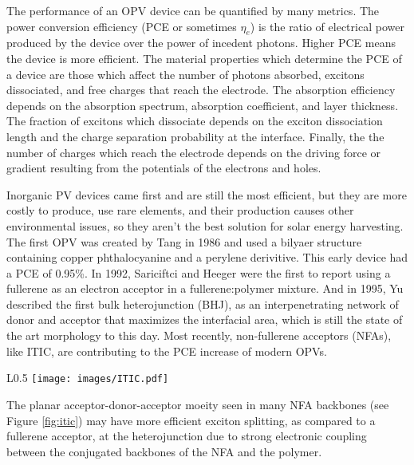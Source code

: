 The performance of an OPV device can be quantified by many metrics.
The power conversion efficiency (PCE or sometimes $\eta_{e}$) is the ratio of electrical power produced by the device over the power of incedent photons.
Higher PCE means the device is more efficient.  
The material properties which determine the PCE of a device are those which affect the number of photons absorbed, excitons dissociated, and free charges that reach the electrode.
The absorption efficiency depends on the absorption spectrum, absorption coefficient, and layer thickness.
The fraction of excitons which dissociate depends on the exciton dissociation length and the charge separation probability at the interface.
Finally, the the number of charges which reach the electrode depends on the driving force or gradient resulting from the potentials of the electrons and holes\cite{Hoppe2004}.

Inorganic PV devices came first and are still the most efficient, but they are more costly to produce, use rare elements, and their production causes other environmental issues, so they aren't the best solution for solar energy harvesting. 
The first OPV was created by Tang in 1986 and used a bilyaer structure containing copper phthalocyanine and a perylene derivitive\cite{Tang1986b}. 
This early device had a PCE of 0.95\%.
In 1992, Sariciftci and Heeger were the first to report using a fullerene as an electron acceptor in a fullerene:polymer mixture\cite{Sariciftci1992}.
And in 1995, Yu described the first bulk heterojunction (BHJ), as an interpenetrating network of donor and acceptor that maximizes the interfacial area, which is still the state of the art morphology to this day\cite{Yu1995}.
Most recently, non-fullerene acceptors (NFAs), like ITIC, are contributing to the PCE increase of modern OPVs\cite{S.Gurney2019b}.

\begin{wrapfigure}{L}{0.5\linewidth}
    \centering
    \texttt{[image: images/ITIC.pdf]}
    \caption{ITIC chemical structure with \textcolor{red}{electron accepting regions in red} and \textcolor{blue}{electron donating regions in blue}}
    \label{fig:itic}
\end{wrapfigure}

The planar acceptor-donor-acceptor moeity seen in many NFA backbones (see Figure \ref{fig:itic}) may have more efficient exciton splitting, as compared to a fullerene acceptor, at the heterojunction due to strong electronic coupling between the conjugated backbones of the NFA and the polymer\cite{Yi2018a}.

